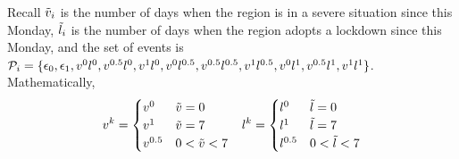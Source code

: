 \documentclass[conf]{new-aiaa}
\begin{document}
Recall $\Tilde{v}_i$ is the number of days when the region is in a severe situation since this Monday, $\Tilde{l}_i$ is the number of days when the region adopts a lockdown since this Monday, and the set of events is $\mathcal{P}_i=\{ \epsilon_0, \epsilon_1,  v^0l^0,  v^{0.5}l^0, v^1l^0, v^0l^{0.5},  v^{0.5}l^{0.5}, v^1l^{0.5}, \\ v^0l^1,  v^{0.5}l^1, v^1l^1\}$. Mathematically, 
\begin{equation}
    \begin{aligned}
        &v^k 
        = \begin{cases}
                v^0  &  \Tilde{v} = 0\\
                v^1  &  \Tilde{v} = 7\\
                v^{0.5} & 0 < \Tilde{v} < 7
                
           \end{cases} 
         &l^k 
        = \begin{cases}
                l^0  &  \Tilde{l} = 0\\
                l^1  &  \Tilde{l} = 7\\
                l^{0.5}  &  0 < \Tilde{l} < 7
                 \end{cases} \\
    \end{aligned}
    \label{eq:covid_reward}
\end{equation}
\end{document}

